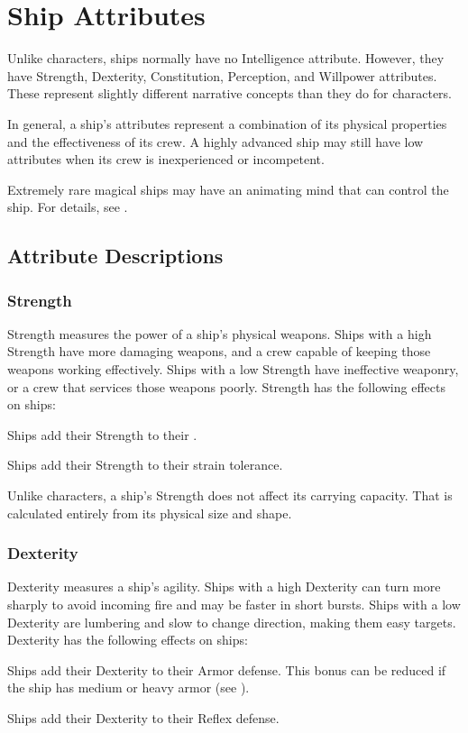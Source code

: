 \section{Ship Attributes}
    Unlike characters, ships normally have no Intelligence attribute.
    However, they have Strength, Dexterity, Constitution, Perception, and Willpower attributes.
    These represent slightly different narrative concepts than they do for characters.

    In general, a ship's attributes represent a combination of its physical properties and the effectiveness of its crew.
    A highly advanced ship may still have low attributes when its crew is inexperienced or incompetent.

    Extremely rare magical ships may have an animating mind that can control the ship.
    For details, see .

    \subsection{Attribute Descriptions}

    \subsubsection{Strength}
        Strength measures the power of a ship's physical weapons.
        Ships with a high Strength have more damaging weapons, and a crew capable of keeping those weapons working effectively.
        Ships with a low Strength have ineffective weaponry, or a crew that services those weapons poorly.
        Strength has the following effects on ships:
        \begin{raggeditemize}
            \item Ships add their Strength to their .
            \item Ships add their Strength to their strain tolerance.
        \end{raggeditemize}

        Unlike characters, a ship's Strength does not affect its carrying capacity.
        That is calculated entirely from its physical size and shape.

    \subsubsection{Dexterity}
        Dexterity measures a ship's agility.
        Ships with a high Dexterity can turn more sharply to avoid incoming fire and may be faster in short bursts.
        Ships with a low Dexterity are lumbering and slow to change direction, making them easy targets.
        Dexterity has the following effects on ships:
        \begin{raggeditemize}
            \item Ships add their Dexterity to their Armor defense.
                This bonus can be reduced if the ship has medium or heavy armor (see ).
            \item Ships add their Dexterity to their Reflex defense.
        \end{raggeditemize}

